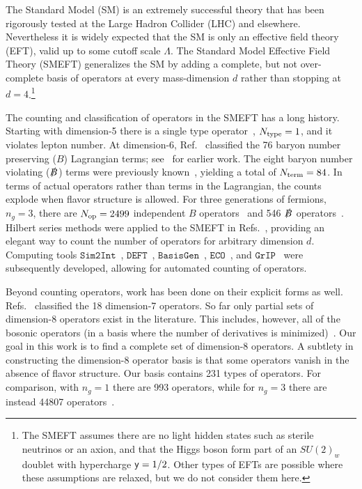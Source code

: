The Standard Model (SM) is an extremely successful theory that has been rigorously tested at the Large Hadron Collider (LHC) and elsewhere.
Nevertheless it is widely expected that the SM is only an effective field theory (EFT), valid up to some cutoff scale $\Lambda$.
The Standard Model Effective Field Theory (SMEFT) generalizes the SM by adding a complete, but not over-complete basis of operators at every mass-dimension $d$ rather than stopping at $d=4$.\footnote{The SMEFT assumes there are no light hidden states such as sterile neutrinos or an axion, and that the Higgs boson form part of an $SU(2)_w$ doublet with hypercharge $\mathsf{y} = 1/2$. Other types of EFTs are possible where these assumptions are relaxed, but we do not consider them here.} 

The counting and classification of operators in the SMEFT has a long history.
Starting with dimension-5 there is a single type operator~\cite{Weinberg:1979sa}, $N_{\rm type} = 1$, and it violates lepton number.
At dimension-6, Ref.~\cite{Grzadkowski:2010es} classified the 76 baryon number preserving ($B$) Lagrangian terms; see~\cite{Buchmuller:1985jz} for earlier work.
The eight baryon number violating ($\slashed B$) terms were previously known~\cite{Abbott:1980zj}, yielding a total of $N_{\rm term} = 84$.
In terms of actual operators rather than terms in the Lagrangian, the counts explode when flavor structure is allowed.
For three generations of fermions, $n_g = 3$, there are $N_{\rm op} = 2499$ independent $B$ operators~\cite{Alonso:2013hga} and 546 $\slashed B$ operators~\cite{Alonso:2014zka}.
Hilbert series methods were applied to the SMEFT in Refs.~\cite{Lehman:2015via, Henning:2015daa, Lehman:2015coa, Henning:2015alf}, providing an elegant way to count the number of operators for arbitrary dimension $d$.
Computing tools $\mathtt{Sim2Int}$~\cite{Fonseca:2017lem}, $\mathtt{DEFT}$~\cite{Gripaios:2018zrz}, $\mathtt{BasisGen}$~\cite{Criado:2019ugp}, $\mathtt{ECO}$~\cite{Marinissen:2020jmb}, and $\mathtt{GrIP}$~\cite{Banerjee:2020bym} were subsequently developed, allowing for automated counting of operators.

Beyond counting operators, work has been done on their explicit forms as well.
Refs.~\cite{Lehman:2014jma, Liao:2016hru} classified the 18 dimension-7 operators.
So far only partial sets of dimension-8 operators exist in the literature.
This includes, however, all of the bosonic operators (in a basis where the number of derivatives is minimized)~\cite{Morozov:1985ef, Hays:2018zze, Remmen:2019cyz}.
Our goal in this work is to find a complete set of dimension-8 operators.
A subtlety in constructing the dimension-8 operator basis is that some operators vanish in the absence of flavor structure.
Our basis contains 231 types of operators.
For comparison, with $n_g = 1$ there are 993 operators, while for $n_g = 3$ there are instead 44807 operators~\cite{Henning:2015alf}.

